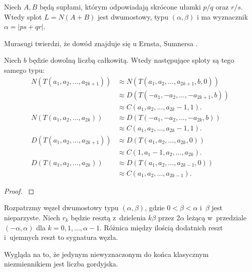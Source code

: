 \begin{proposition}
    Niech $A, B$ będą supłami, którym odpowiadają skrócone ułamki $p/q$ oraz $r/s$.
    Wtedy splot $L = N(A+B)$ jest dwumostowy, typu $(\alpha, \beta)$ i ma wyznacznik $\alpha = |ps + qr|$.
\end{proposition}

Murasugi \cite[twierdzenie 9.3.5]{murasugi1996} twierdzi, że dowód znajduje się u Ernsta, Sumnersa \cite[lemat 2.1]{ernst1990}.
%
%


\begin{proposition}
    Niech $b$ będzie dowolną liczbą całkowitą.
    Wtedy następujące sploty są tego samego typu:
    \begin{align}
        N(T(a_1, a_2, \ldots, a_{2k+1})) & \approx N(T(a_1, a_2, \ldots, a_{2k+1}, b, 0)) \\
                                         & \approx D(T(-a_1, -a_2, \ldots, -a_{2k+1}, b)) \\
                                         & \approx C(a_1, a_2, \ldots, a_{2k}-1, 1). \\
        N(T(a_1, a_2, \ldots, a_{2k}))   & \approx D(T(-a_1, -a_2, \ldots, -a_{2k}, b)) \\
                                         & \approx C(a_1, a_2, \ldots, a_{2k}-1, 1). \\
        D(T(a_1, a_2, \ldots, a_{2k+1})) & \approx D(T(a_1, a_2, \ldots, a_{2k}, 0)) \\
                                         & \approx C(1, a_1-1, a_2, \ldots, a_{2k}). \\
        D(T(a_1, a_2, \ldots, a_{2k}))   & \approx D(T(a_1, a_2, \ldots, a_{2k-1}, 0)) \\
                                         & \approx C(a_1, a_2, \ldots, a_{2k-1}).
    \end{align}
\end{proposition}

\begin{proof}
    \cite[fakt 9.3.4]{murasugi1996}
\end{proof}

\begin{proposition}
    Rozpatrzmy węzeł dwumostowy typu $(\alpha, \beta)$, gdzie $0 < \beta < \alpha$ i~$\beta$ jest nieparzyste.
    Niech $r_k$ będzie resztą z~dzielenia $k\beta$ przez $2\alpha$ leżącą w~przedziale $(-\alpha, \alpha)$ dla $k = 0, 1, \ldots, \alpha - 1$.
    Różnica między ilością dodatnich reszt i~ujemnych reszt to sygnatura węzła.
\end{proposition}

Wygląda na to, że jedynym niewyznaczonym do końca klasycznym niezmiennikiem jest liczba gordyjska.

%



